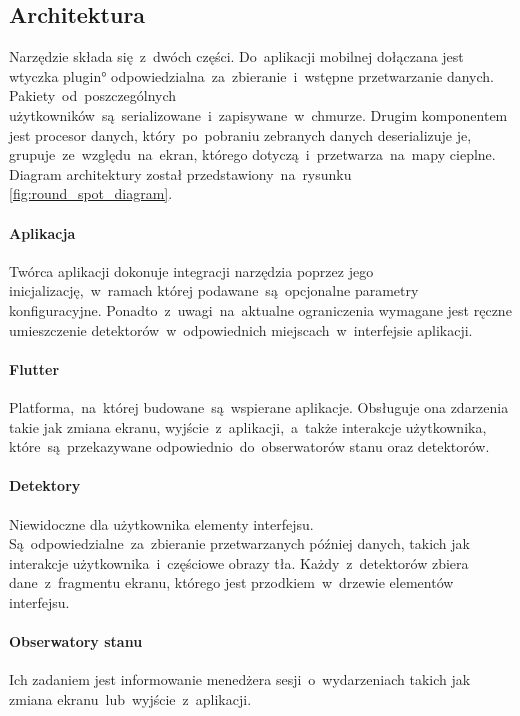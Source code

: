 \subsection{Architektura}
Narzędzie składa się~z~dwóch części. Do~aplikacji mobilnej dołączana jest wtyczka \ang{plugin} odpowiedzialna~za~zbieranie~i~wstępne przetwarzanie danych. Pakiety~od~poszczególnych użytkowników~są~serializowane~i~zapisywane~w~chmurze. Drugim komponentem jest procesor danych, który~po~pobraniu zebranych danych deserializuje je, grupuje~ze~względu~na~ekran, którego dotyczą~i~przetwarza~na~mapy cieplne. Diagram architektury został przedstawiony~na~rysunku \ref{fig:round_spot_diagram}.
\bigskip
{}

\paragraph{Aplikacja}
Twórca aplikacji dokonuje integracji narzędzia poprzez jego inicjalizację,~w~ramach której podawane~są~opcjonalne parametry konfiguracyjne. Ponadto~z~uwagi~na~aktualne ograniczenia wymagane jest ręczne umieszczenie detektorów~w~odpowiednich miejscach~w~interfejsie aplikacji.

\paragraph{Flutter} Platforma,~na~której budowane~są~wspierane aplikacje. Obsługuje ona zdarzenia takie jak zmiana ekranu, wyjście~z~aplikacji,~a~także interakcje użytkownika, które~są~przekazywane odpowiednio~do~obserwatorów stanu oraz detektorów.

\paragraph{Detektory} 
\label{par:rs_detectors}
Niewidoczne dla użytkownika elementy interfejsu. Są~odpowiedzialne~za~zbieranie przetwarzanych później danych, takich jak interakcje użytkownika~i~częściowe obrazy tła. Każdy~z~detektorów zbiera dane~z~fragmentu ekranu, którego jest przodkiem~w~drzewie elementów interfejsu.

\paragraph{Obserwatory stanu} 
\label{par:rs_observers}
Ich zadaniem jest informowanie menedżera sesji~o~wydarzeniach takich jak zmiana ekranu~lub~wyjście~z~aplikacji.

